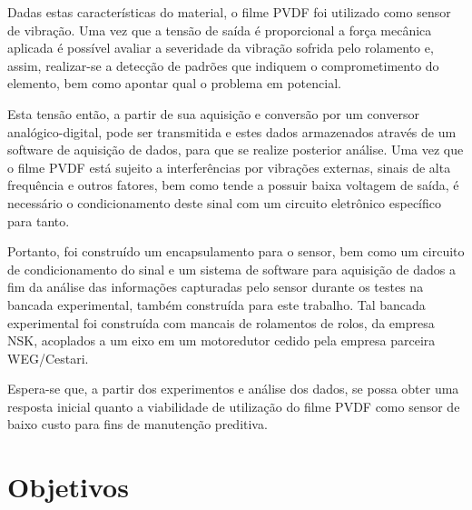 \documentclass[
	12pt,				
	oneside,			
	a4paper,			
	english,			
	brazil,			
	]{abntex2ppgsi}
\begin{document}
Dadas estas características do material, o filme PVDF foi utilizado como sensor de vibração. Uma vez que a tensão de saída é proporcional a força mecânica aplicada é possível avaliar a severidade da vibração sofrida pelo rolamento e, assim, realizar-se a detecção de padrões que indiquem o comprometimento do elemento, bem como apontar qual o problema em potencial.


Esta tensão então, a partir de sua aquisição e conversão por um conversor analógico-digital, pode ser transmitida e estes dados armazenados através de um software de aquisição de dados, para que se realize posterior análise. Uma vez que o filme PVDF está sujeito a interferências por vibrações externas, sinais de alta frequência e outros fatores, bem como tende a possuir baixa voltagem de saída, é necessário o condicionamento deste sinal com um circuito eletrônico específico para tanto. 


Portanto, foi construído um encapsulamento para o sensor, bem como um circuito de condicionamento do sinal e um sistema de software para aquisição de dados a fim da análise das informações capturadas pelo sensor durante os testes na bancada experimental, também construída para este trabalho. Tal bancada experimental foi construída com mancais de rolamentos de rolos, da empresa NSK, acoplados a um eixo em um motoredutor cedido pela empresa parceira WEG/Cestari. 

Espera-se que, a partir dos experimentos e análise dos dados, se possa obter uma resposta inicial quanto a viabilidade de utilização do filme PVDF como sensor de baixo custo para fins de manutenção preditiva.



\chapter{Objetivos}
\end{document}
